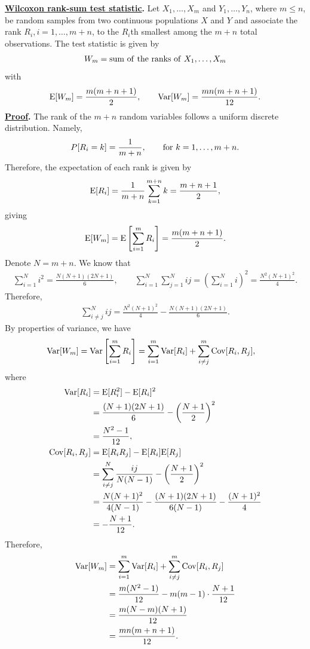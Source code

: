 \textbf{\underline{Wilcoxon rank-sum test statistic}.} Let $X_1, \ldots, X_m$ and $Y_1, \ldots, Y_n$, where $m\leq n$, be random samples from two continuous populations $X$ and $Y$ and associate the rank $R_i, i = 1,\ldots, m+n$, to the $R_i$th smallest among the $m+n$ total observations. The test statistic is given by
\begin{align*}
W_m = \mathrm{sum\ of\ the\ ranks\ of\ } X_1, \ldots, X_m
\end{align*}
with
\begin{align*}
\mathrm{E}[W_m] = \frac{m(m+n+1)}{2}, \qquad \mathrm{Var}[W_m] = \frac{mn(m+n+1)}{12}.
\end{align*}
\textbf{\underline{Proof}.} The rank of the $m+n$ random variables follows a uniform discrete distribution. Namely,
\begin{align*}
P[R_i = k] = \frac{1}{m+n}, \qquad \mathrm{for\ } k = 1, \ldots, m+n.
\end{align*}
Therefore, the expectation of each rank is given by
\begin{align*}
\mathrm{E}[R_i] = \frac{1}{m+n} \sum_{k=1}^{m+n}k = \frac{m+n+1}{2},
\end{align*}
giving
\begin{align*}
\mathrm{E}[W_m] = \mathrm{E}\left[\sum_{i=1}^m R_i \right] = \frac{m(m+n+1)}{2}.
\end{align*}
Denote $N = m + n$. We know that
\begin{align*}
\sum_{i=1}^{N} i^2 = \frac{N(N+1)(2N+1)}{6}, \qquad \sum_{i=1}^{N}\sum_{j=1}^N ij = \left(\sum_{i=1}^{N} i \right)^2 = \frac{N^2(N+1)^2}{4}.
\end{align*}
Therefore,
\begin{align*}
\sum_{i\neq j}^{N} ij = \frac{N^2(N+1)^2}{4} - \frac{N(N+1)(2N+1)}{6}.
\end{align*}
By properties of variance, we have
\begin{align*}
\mathrm{Var}[W_m] & = \mathrm{Var}\left[\sum_{i=1}^m R_i\right] = \sum_{i=1}^m \mathrm{Var}[R_i] + \sum_{i\neq j}^m \mathrm{Cov}[R_i, R_j],
\end{align*}
where
\begin{align*}
\mathrm{Var}[R_i] & = \mathrm{E}[R_i^2] - \mathrm{E}[R_i]^2 \\
& = \frac{(N+1)(2N+1)}{6} - \left(\frac{N+1}{2} \right)^2 \\
& = \frac{N^2-1}{12}, \\
\mathrm{Cov}[R_i, R_j] & = \mathrm{E}[R_iR_j] - \mathrm{E}[R_i]\mathrm{E}[R_j] \\
& = \sum_{i\neq j}^N \frac{ij}{N(N-1)} - \left(\frac{N+1}{2} \right)^2 \\
& = \frac{N(N+1)^2}{4(N-1)} - \frac{(N+1)(2N+1)}{6(N-1)} - \frac{(N+1)^2}{4} \\
& = -\frac{N+1}{12}.
\end{align*}
Therefore,
\begin{align*}
\mathrm{Var}[W_m] & = \sum_{i=1}^m \mathrm{Var}[R_i] + \sum_{i\neq j}^m \mathrm{Cov}[R_i, R_j] \\
& = \frac{m(N^2-1)}{12} - m(m-1)\cdot \frac{N+1}{12} \\
& = \frac{m(N-m)(N+1)}{12} \\
& = \frac{mn(m+n+1)}{12}.
\end{align*}

